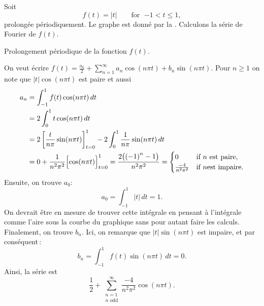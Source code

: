\begin{example}
Soit
\begin{equation*}
f(t) =
\lvert t \rvert
\qquad \text{for } \; {-1} < t \leq 1,
\end{equation*}
prolongée périodiquement.  Le graphe est donné par la .
Calculons la série de Fourier de $f(t)$.

\begin{myfig}
\capstart
{}
\caption{Prolongement périodique de la fonction $f(t)$.\label{gfs:sawcontfig}}
\end{myfig}

On veut écrire $f(t) = \frac{a_0}{2} + \sum_{n=1}^\infty a_n \cos (n \pi t) + b_n
\sin (n \pi t)$.  Pour $n \geq 1$ on note que $\lvert t \rvert \cos (n \pi t)$
est paire et aussi
\begin{equation*}
\begin{split}
a_n & = \int_{-1}^1 f(t) \cos (n \pi t) \, dt \\
& = 2 \int_{0}^1 t \cos (n \pi t) \, dt \\
 & = 2 \left[ \frac{t}{n \pi} \sin (n \pi t) \right]_{t=0}^1 -
2 \int_{0}^1 \frac{1}{n \pi} \sin (n \pi t) \, dt \\
& =  0 + \frac{1}{n^2 \pi^2} \Bigl[ \cos (n \pi t) \Bigr]_{t=0}^1
 =  \frac{2 \bigl( {(-1)}^n -1 \bigr) }{n^2 \pi^2}
=
\begin{cases}
0 & \text{if } n \text{ est paire} , \\
\frac{-4 }{n^2 \pi^2} & \text{if } n \text{est impaire}  .
\end{cases}
\end{split}
\end{equation*}
Ensuite, on trouve $a_0$:
\begin{equation*}
a_0 = \int_{-1}^1 \lvert t \rvert \, dt 
=
1 .
\end{equation*}
On devrait être en mesure de trouver cette intégrale en pensant à l'intégrale comme l'aire sous la courbe du graphique sans pour autant faire les calculs. Finalement, on trouve $b_n$.  Ici, on remarque que
$\lvert t \rvert \sin (n \pi t)$ est impaire, et par conséquent\,: 
\begin{equation*}
b_n = \int_{-1}^1 f(t) \sin (n \pi t) \, dt = 0 .
\end{equation*}
Ainsi, la série est
\begin{equation*}
\frac{1}{2} + 
\sum_{\substack{n=1 \\ n \text{ odd}}}^\infty \frac{-4}{n^2 \pi^2} \cos (n \pi t) .
\end{equation*}


\end{example}

